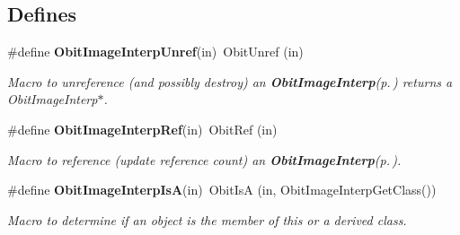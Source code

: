 \subsection*{Defines}
\begin{CompactItemize}
\item 
\#define {\bf Obit\-Image\-Interp\-Unref}(in)\ Obit\-Unref (in)
\begin{CompactList}\small\item\em Macro to unreference (and possibly destroy) an {\bf Obit\-Image\-Interp}{\rm (p.\,\pageref{structObitImageInterp})} returns a Obit\-Image\-Interp$\ast$. \item\end{CompactList}\item 
\#define {\bf Obit\-Image\-Interp\-Ref}(in)\ Obit\-Ref (in)
\begin{CompactList}\small\item\em Macro to reference (update reference count) an {\bf Obit\-Image\-Interp}{\rm (p.\,\pageref{structObitImageInterp})}. \item\end{CompactList}\item 
\#define {\bf Obit\-Image\-Interp\-Is\-A}(in)\ Obit\-Is\-A (in, Obit\-Image\-Interp\-Get\-Class())
\begin{CompactList}\small\item\em Macro to determine if an object is the member of this or a derived class. \item\end{CompactList}\end{CompactItemize}

